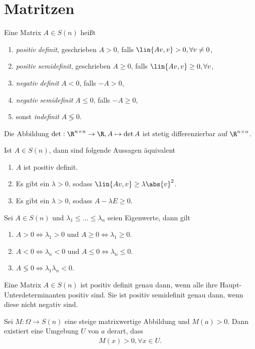 \section{Matritzen}

\begin{defn}
Eine Matrix $A\in S(n)$ heißt
\begin{enumerate}
  \item \emph{positiv definit}, geschrieben $A > 0$, falls $\lin{Av,v} > 0,
  \forall v\neq 0$,
  \item \emph{positiv semidefinit}, geschrieben $A \ge 0$, falls $\lin{Av,v} \ge
  0, \forall v$,
  \item \emph{negativ definit} $A < 0$, falls $-A > 0$,
  \item \emph{negativ semidefinit} $A\le 0$, falls $-A \ge 0$,
  \item sonst \emph{indefinit} $A \lessgtr 0$.
\end{enumerate}
\end{defn}

\begin{prop}
Die Abbildung $\det: \R^{n\times n} \to \R, A\mapsto \det A$ ist stetig
differenzierbar auf $\R^{n\times n}$.
\end{prop}
\begin{prop}
Ist $A\in S(n)$, dann sind folgende Aussagen äquivalent
\begin{enumerate}
  \item $A$ ist positiv definit.
  \item Es gibt ein $\lambda > 0$, sodass $\lin{Av,v} \ge \lambda\abs{v}^2$.
  \item Es gibt ein $\lambda > 0$, sodass $A -\lambda E \ge 0$.
\end{enumerate}
\end{prop}
\begin{prop}
Sei $A\in S(n)$ und $\lambda_1\le\ldots\le\lambda_n$ seien Eigenwerte, dann gilt
\begin{enumerate}
  \item $A > 0 \Leftrightarrow \lambda_1 > 0$ und $A \ge 0 \Leftrightarrow
  \lambda_1 \ge 0$.
  \item $A < 0 \Leftrightarrow \lambda_n < 0$ und $A \le 0 \Leftrightarrow
  \lambda_n \le 0$.
  \item $A \lessgtr 0 \Leftrightarrow \lambda_1\lambda_n < 0$. 
\end{enumerate}
\end{prop}
\begin{prop}
Eine Matrix $A\in S(n)$ ist positiv definit genau dann, wenn alle ihre
Haupt-Unterdeterminanten positiv sind. Sie ist positiv semidefinit genau dann,
wenn diese nicht negativ sind.
\end{prop}
\begin{prop}
Sei $M:\Omega\to S(n)$ eine steige matrixwertige Abbildung und $M(a) > 0$. Dann
existiert eine Umgebung $U$ von $a$ derart, dass
\begin{align*}
M(x) > 0, \forall x\in U.
\end{align*}
\end{prop}